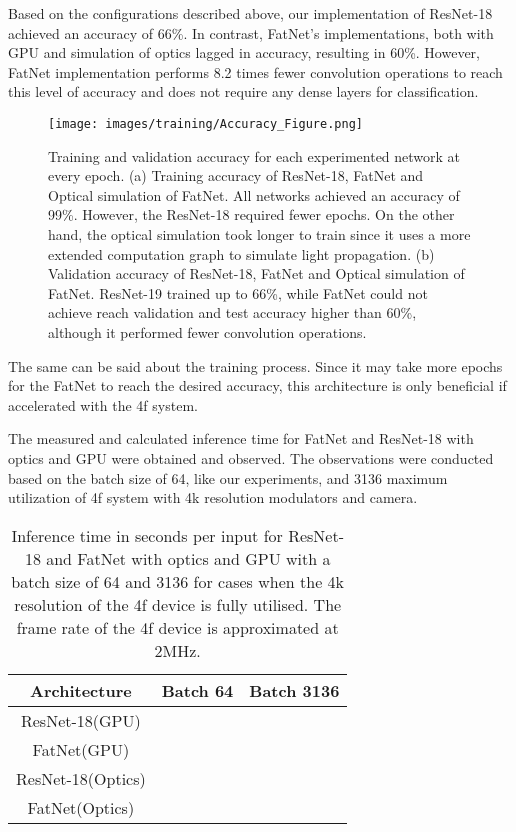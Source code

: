 \documentclass{article}
\begin{document}
Based on the configurations described above, our implementation of ResNet-18 achieved an accuracy of 66\%. In contrast, FatNet's implementations, both with GPU and simulation of optics lagged in accuracy, resulting in 60\%. However, FatNet implementation performs 8.2 times fewer convolution operations to reach this level of accuracy and does not require any dense layers for classification. 

\begin{figure}[H]
\centering
\texttt{[image: images/training/Accuracy\_Figure.png]}
\caption{Training and validation accuracy for each experimented network at every epoch\label{fig:acc}. (a) Training accuracy of ResNet-18, FatNet and Optical simulation of FatNet. All networks achieved an accuracy of 99\%. However, the ResNet-18 required fewer epochs. On the other hand, the optical simulation took longer to train since it uses a more extended computation graph to simulate light propagation. (b)  Validation accuracy of ResNet-18, FatNet and Optical simulation of FatNet. ResNet-19 trained up to 66\%, while FatNet could not achieve reach validation and test accuracy higher than 60\%, although it performed fewer convolution operations.}
\end{figure} 

The same can be said about the training process. Since it may take more epochs for the FatNet to reach the desired accuracy, this architecture is only beneficial if accelerated with the 4f system. 

The measured and calculated inference time for FatNet and ResNet-18 with optics and GPU were obtained and observed. The observations were conducted based on the batch size of 64, like our experiments, and 3136 maximum utilization of 4f system with 4k resolution modulators and camera. 

\begin{table}[H]
\centering
\caption{ Inference time in seconds per input for ResNet-18 and FatNet with optics and GPU with a batch size of 64 and 3136 for cases when the 4k resolution of the 4f device is fully utilised. The frame rate of the 4f device is approximated at 2MHz\cite{li_channel_2020}.}
\begin{tabular}{ccc}
\toprule
\textbf{Architecture}	& \textbf{Batch 64}	& \textbf{Batch 3136} \\
\midrule
ResNet-18(GPU)	                 	& 		& \\
FatNet(GPU)	                     	& 		& \\
ResNet-18(Optics)	            	& 	    & \\
FatNet(Optics)	                	& 	    & \\
\bottomrule
\end{tabular}
 \label{tab3}
\end{table}
\unskip
\end{document}
